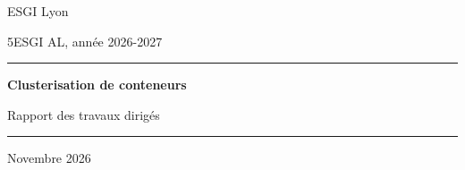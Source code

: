 \documentclass[11pt,a4paper,openany]{report}
\begin{document}
\begin{titlepage}
  \centering
  \vspace*{2.5cm}
  {\Large ESGI Lyon\par}
  \vspace{4pt}
  {\large 5ESGI AL, année 2026-2027\par}
  \vspace{3cm}
  {\color{td1}\rule{\linewidth}{0.8pt}\par}
  \vspace{14pt}
  {\Huge\bfseries Clusterisation de conteneurs\par}
  \vspace{10pt}
  {\LARGE Rapport des travaux dirigés\par}
  \vspace{14pt}
  {\color{td1}\rule{\linewidth}{0.8pt}\par}
  \vfill
  {\Large\auteur\par}
  \vspace{6pt}
  {\large Novembre 2026\par}
\end{titlepage}

\clearpage
{}\hypertarget{sommaire}{}
\tableofcontents





\end{document}
